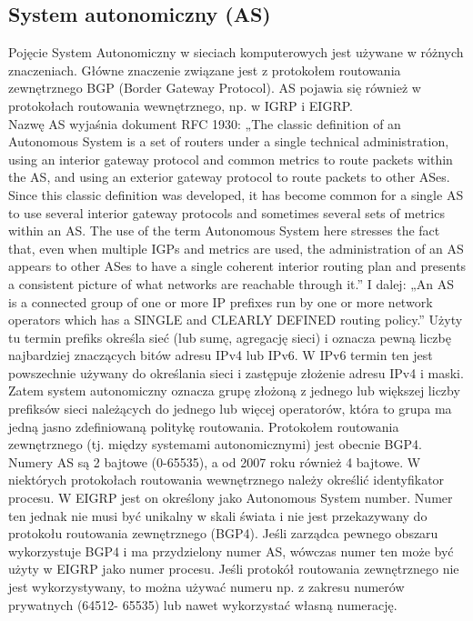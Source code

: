 \documentclass[a4paper]{article}
\begin{document}
\subsection{System autonomiczny (AS)}
Pojęcie System Autonomiczny w sieciach komputerowych jest używane w różnych
znaczeniach. Główne znaczenie związane jest z protokołem routowania zewnętrznego BGP
(Border Gateway Protocol). AS pojawia się również w protokołach routowania wewnętrznego, np. w IGRP i EIGRP.\\
Nazwę AS wyjaśnia dokument RFC 1930: „The classic definition of an Autonomous System is a set of routers
under a single technical administration, using an interior gateway
protocol and common metrics to route packets within the AS, and using an
exterior gateway protocol to route packets to other ASes. Since this
classic definition was developed, it has become common for a single AS to
use several interior gateway protocols and sometimes several sets of
metrics within an AS. The use of the term Autonomous System here stresses
the fact that, even when multiple IGPs and metrics are used, the
administration of an AS appears to other ASes to have a single coherent
interior routing plan and presents a consistent picture of what networks
are reachable through it.”
I dalej:
„An AS is a connected group of one or more IP prefixes run by one or more
network operators which has a SINGLE and CLEARLY DEFINED routing policy.”
Użyty tu termin prefiks określa sieć (lub sumę, agregację sieci) i oznacza pewną liczbę
najbardziej znaczących bitów adresu IPv4 lub IPv6. W IPv6 termin ten jest powszechnie
używany do określania sieci i zastępuje złożenie adresu IPv4 i maski.
Zatem system autonomiczny oznacza grupę złożoną z jednego lub większej liczby prefiksów
sieci należących do jednego lub więcej operatorów, która to grupa ma jedną jasno
zdefiniowaną politykę routowania.
Protokołem routowania zewnętrznego (tj. między systemami autonomicznymi) jest obecnie
BGP4.
Numery AS są 2 bajtowe (0-65535), a od 2007 roku również 4 bajtowe.
W niektórych protokołach routowania wewnętrznego należy określić identyfikator procesu. W EIGRP jest on określony jako Autonomous
System number. Numer ten jednak nie musi być unikalny w skali świata i nie jest
przekazywany do protokołu routowania zewnętrznego (BGP4). Jeśli zarządca pewnego
obszaru wykorzystuje BGP4 i ma przydzielony numer AS, wówczas numer ten może być użyty
w EIGRP jako numer procesu. Jeśli protokół routowania zewnętrznego nie jest
wykorzystywany, to można używać numeru np. z zakresu numerów prywatnych (64512-
65535) lub nawet wykorzystać własną numerację.
\end{document}
